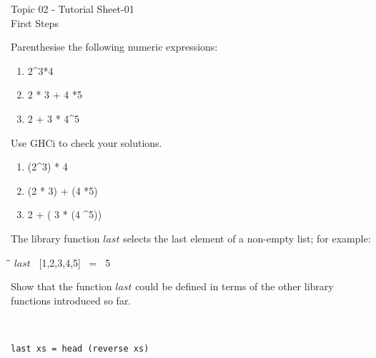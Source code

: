 \documentclass{article}
\newcommand\ExTitle{First Steps \ }
\newcommand\fullExTitle{Topic 02 - Tutorial Sheet-01 \\ \ExTitle }
\begin{document}
\begin{Huge}
	\begin{center}
	\fullExTitle
	\end{center}
\end{Huge}

\begin{exercise} 
	
  Parenthesise the following numeric expressions:  \\
	\begin{enumerate}
 	 \item
 		2\^{}3*4 \\
	 \item
 		2 * 3 + 4 *5\\
 
	 \item
 		2 + 3 * 4\^{}5\\
	\end{enumerate}  
   Use GHCi to check your solutions. 
   
\end{exercise}
\begin{solution}
	\begin{enumerate}
 	 \item
 (2\^{}3) * 4
	 \item

          (2 * 3) + (4 *5)
	 \item
  2 + ( 3 * (4 \^{}5))
	\end{enumerate}  
\end{solution}

\begin{exercise} 
The library function ${last}$ selects the last element of a non-empty list; for example:\\
\begin{tabbing}
	\=\hspace{2em}\=\kill
	\>\> $last$ \ [1,2,3,4,5] \ = \ 5 \\
\end{tabbing}
Show that the function $last$ could be defined in terms of the other library functions introduced so far. 
\end{exercise} \\
\begin{solution}
\begin{lstlisting}
last xs = head (reverse xs)
\end{lstlisting}
\end{solution}
\pagebreak	
\end{document}
